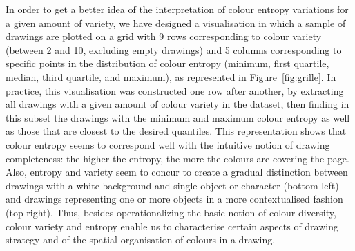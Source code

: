 \documentclass[11pt,a4paper]{article}
\begin{document}
In order to get a better idea of the interpretation of colour entropy variations for a given amount of variety, we have designed a visualisation in which a sample of drawings are plotted on a grid with 9 rows corresponding to colour variety (between 2 and 10, excluding empty drawings) and 5 columns corresponding to specific points in the distribution of colour entropy (minimum, first quartile, median, third quartile, and maximum), as represented in Figure~\ref{fig:grille}. In practice, this visualisation was constructed one row after another, by extracting all drawings with a given amount of colour variety in the dataset, then finding in this subset the drawings with the minimum and maximum colour entropy as well as those that are closest to the desired quantiles. This representation shows that colour entropy seems to correspond well with the intuitive notion of drawing completeness: the higher the entropy, the more the colours are covering the page. Also, entropy and variety seem to concur to create a gradual distinction between drawings with a white background and single object or character (bottom-left) and drawings representing one or more objects in a more contextualised fashion (top-right). Thus, besides operationalizing the basic notion of colour diversity, colour variety and entropy enable us to characterise certain aspects of drawing strategy and of the spatial organisation of colours in a drawing.


\end{document}

